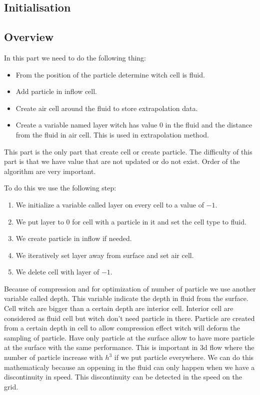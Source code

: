 \subsection{Initialisation}

\subsection{Overview}
In this part we need to do the following thing:
\begin{itemize}
 \item From the position of the particle determine witch cell is fluid.
 \item Add particle in inflow cell.
 \item Create air cell around the fluid to store extrapolation data.
 \item Create a variable named layer witch has value 0 in the fluid and the distance from the fluid in air cell.
 This is used in extrapolation method.
\end{itemize}
This part is the only part that create cell or create particle.
The difficulty of this part is that we have value that are not updated or do not exist.
Order of the algorithm are very important.

To do this we use the following step:
\begin{enumerate}
 \item We initialize a variable called layer on every cell to a value of $-1$.
 \item We put layer to $0$ for cell with a particle in it and set the cell type to fluid.
 \item We create particle in inflow if needed.
 \item We iteratively set layer away from surface and set air cell.
 \item We delete cell with layer of $-1$.
\end{enumerate}

Because of compression and for optimization of number of particle we use another variable called depth.
This variable indicate the depth in fluid from the surface.
Cell witch are bigger than a certain depth are interior cell.
Interior cell are considered as fluid cell but witch don't need particle in there.
Particle are created from  a certain depth in cell to allow compression effect witch will deform the sampling of particle.
Have only particle at the surface allow to have more particle at the surface with the same performance. This is important in 3d flow
where the number of particle increase with $h^3$ if we put particle everywhere.
We can do this mathematicaly because an oppening in the fluid can only happen when we have a discontinuity in speed.
This discontinuity can be detected in the speed on the grid.

